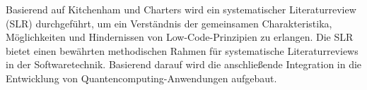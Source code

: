 
Basierend auf Kitchenham und Charters \cite{kitchenham2007guidelines} wird ein systematischer 
Literaturreview (SLR) durchgeführt, um ein Verständnis der gemeinsamen Charakteristika, Möglichkeiten 
und Hindernissen von Low-Code-Prinzipien zu erlangen. Die SLR bietet einen bewährten methodischen 
Rahmen für systematische Literaturreviews in der Softwaretechnik. Basierend darauf wird die 
anschließende Integration in die Entwicklung von Quantencomputing-Anwendungen aufgebaut.

